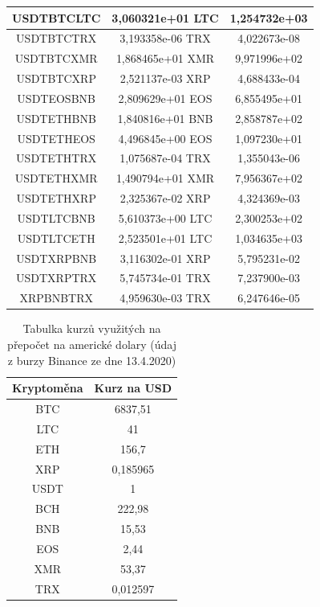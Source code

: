 \documentclass[thesis=B,czech]{FITthesis}[2019/03/21]
\begin{document}
\begin{table}
\begin{tabular}{|| c | c | c ||}
 \hline USDTBTCLTC & 3,060321e+01 LTC & 1,254732e+03\\ 
 \hline USDTBTCTRX & 3,193358e-06 TRX & 4,022673e-08\\ 
 \hline USDTBTCXMR & 1,868465e+01 XMR & 9,971996e+02\\ 
 \hline USDTBTCXRP & 2,521137e-03 XRP & 4,688433e-04\\ 
 \hline USDTEOSBNB & 2,809629e+01 EOS & 6,855495e+01\\ 
 \hline USDTETHBNB & 1,840816e+01 BNB & 2,858787e+02\\ 
 \hline USDTETHEOS & 4,496845e+00 EOS & 1,097230e+01\\ 
 \hline USDTETHTRX & 1,075687e-04 TRX & 1,355043e-06\\ 
 \hline USDTETHXMR & 1,490794e+01 XMR & 7,956367e+02\\ 
 \hline USDTETHXRP & 2,325367e-02 XRP & 4,324369e-03\\ 
 \hline USDTLTCBNB & 5,610373e+00 LTC & 2,300253e+02\\ 
 \hline USDTLTCETH & 2,523501e+01 LTC & 1,034635e+03\\ 
 \hline USDTXRPBNB & 3,116302e-01 XRP & 5,795231e-02\\ 
 \hline USDTXRPTRX & 5,745734e-01 TRX & 7,237900e-03\\ 
 \hline XRPBNBTRX & 4,959630e-03 TRX & 6,247646e-05\\ 
 \hline
\end{tabular}
\end{table}

\begin{table}\centering
\caption{Tabulka kurzů využitých na přepočet na americké dolary (údaj z burzy Binance ze dne 13.4.2020)}
\label{table_rates}
\begin{tabular}{|| c | c ||}
\hline Kryptoměna & Kurz na USD \\ 
\hline\hline BTC & 6837,51 \\ 
\hline LTC & 41 \\ 
\hline ETH & 156,7 \\ 
\hline XRP & 0,185965 \\ 
\hline USDT & 1 \\ 
\hline BCH & 222,98 \\ 
\hline BNB & 15,53 \\ 
\hline EOS & 2,44 \\ 
\hline XMR & 53,37 \\ 
\hline TRX & 0,012597 \\ 
\hline
\end{tabular}
\end{table}
\end{document}
